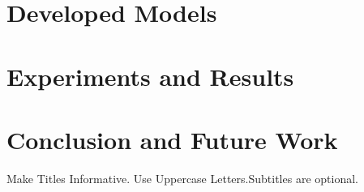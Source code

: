 \documentclass{beamer}
\begin{document}
\section{Developed Models} 

\section{Experiments and Results}


\section{Conclusion and Future Work}

\begin{frame}{Make Titles Informative. Use Uppercase Letters.}{Subtitles are optional.}

\end{frame}
\end{document}
